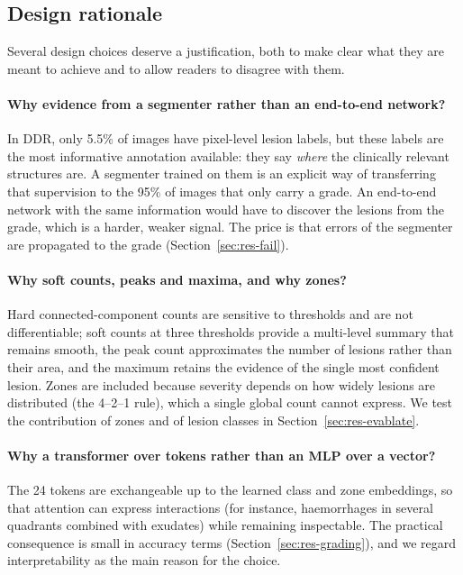 \subsection{Design rationale}
\label{sec:rationale}
Several design choices deserve a justification, both to make clear what they are meant to achieve and to allow readers to disagree with them.

\paragraph{Why evidence from a segmenter rather than an end-to-end network?} In DDR, only 5.5\% of images have pixel-level lesion labels, but these labels are the most informative annotation available: they say \emph{where} the clinically relevant structures are. A segmenter trained on them is an explicit way of transferring that supervision to the 95\% of images that only carry a grade. An end-to-end network with the same information would have to discover the lesions from the grade, which is a harder, weaker signal. The price is that errors of the segmenter are propagated to the grade (Section~\ref{sec:res-fail}).

\paragraph{Why soft counts, peaks and maxima, and why zones?} Hard connected-component counts are sensitive to thresholds and are not differentiable; soft counts at three thresholds provide a multi-level summary that remains smooth, the peak count approximates the number of lesions rather than their area, and the maximum retains the evidence of the single most confident lesion. Zones are included because severity depends on how widely lesions are distributed (the 4--2--1 rule), which a single global count cannot express. We test the contribution of zones and of lesion classes in Section~\ref{sec:res-evablate}.

\paragraph{Why a transformer over tokens rather than an MLP over a vector?} The 24 tokens are exchangeable up to the learned class and zone embeddings, so that attention can express interactions (for instance, haemorrhages in several quadrants combined with exudates) while remaining inspectable. The practical consequence is small in accuracy terms (Section~\ref{sec:res-grading}), and we regard interpretability as the main reason for the choice.

